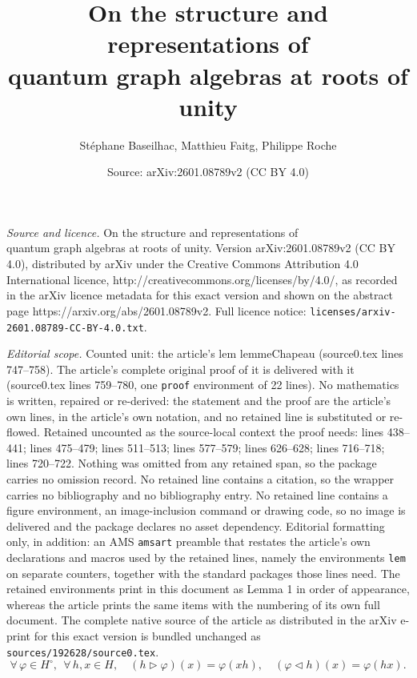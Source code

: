 \documentclass[10pt,a4paper]{amsart}
\title{On the structure and representations of \\ quantum graph algebras at roots of unity}
\author{St\'ephane Baseilhac, Matthieu Faitg, Philippe Roche}
\date{Source: arXiv:2601.08789v2 (CC BY 4.0)}
\begin{document}
\maketitle

\noindent\emph{Source and licence.} On the structure and representations of \\ quantum graph algebras at roots of unity. Version arXiv:2601.08789v2 (CC BY 4.0), distributed by arXiv under the Creative Commons Attribution 4.0 International licence, http://creativecommons.org/licenses/by/4.0/, as recorded in the arXiv licence metadata for this exact version and shown on the abstract page https://arxiv.org/abs/2601.08789v2. Full licence notice: \texttt{licenses/arxiv-2601.08789-CC-BY-4.0.txt}.\par\smallskip

\noindent\textit{Editorial scope.} Counted unit: the article's lem lemmeChapeau (source0.tex lines 747--758). The article's complete original proof of it is delivered with it (source0.tex lines 759--780, one \texttt{proof} environment of 22 lines). No mathematics is written, repaired or re-derived: the statement and the proof are the article's own lines, in the article's own notation, and no retained line is substituted or re-flowed.  Retained uncounted as the source-local context the proof needs: lines 438--441; lines 475--479; lines 511--513; lines 577--579; lines 626--628; lines 716--718; lines 720--722.  Nothing was omitted from any retained span, so the package carries no omission record.  No retained line contains a citation, so the wrapper carries no bibliography and no bibliography entry.  No retained line contains a figure environment, an image-inclusion command or drawing code, so no image is delivered and the package declares no asset dependency.  Editorial formatting only, in addition: an AMS \texttt{amsart} preamble that restates the article's own declarations and macros used by the retained lines, namely the environments \texttt{lem} on separate counters, together with the standard packages those lines need.  The retained environments print in this document as Lemma 1 in order of appearance, whereas the article prints the same items with the numbering of its own full document.  The complete native source of the article as distributed in the arXiv e-print for this exact version is bundled unchanged as \texttt{sources/192628/source0.tex}.
\begin{equation}\label{coregActions}
\forall \, \varphi \in H^\circ, \:\: \forall \, h,x \in H, \quad
(h \rhd \varphi)(x) = \varphi(xh), \quad (\varphi \lhd h)(x) = \varphi(hx).
\end{equation}
\end{document}
